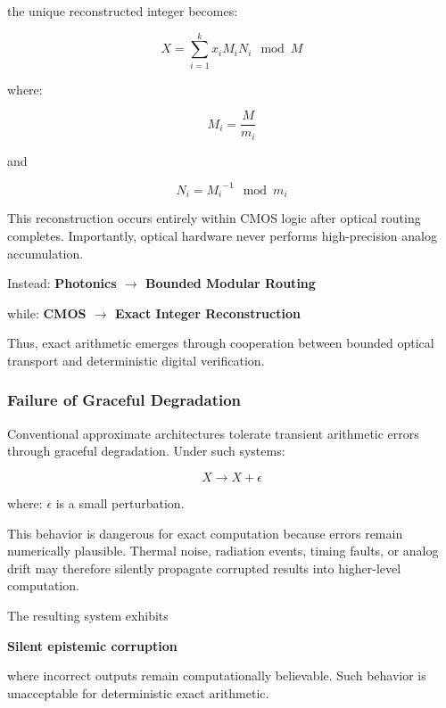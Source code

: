 \documentclass[journal]{IEEEtran}
\begin{document}
the unique reconstructed integer becomes:

\begin{equation}
X = \sum_{i=1}^k x_i M_i N_i \mod M
\end{equation}

where:

\begin{equation}
M_i = \frac{M}{m_i}
\end{equation}

and

\begin{equation}
N_i = {M_i}^{-1} \mod m_i
\end{equation}

This reconstruction occurs entirely within CMOS logic after optical routing completes. Importantly, optical hardware never performs high-precision analog accumulation.

Instead:
\textbf{Photonics $\rightarrow$ Bounded Modular Routing}

while:
\textbf{CMOS $\rightarrow$ Exact Integer Reconstruction}

Thus, exact arithmetic emerges through cooperation between bounded optical transport and deterministic digital verification.

\subsubsection{\textbf{Failure of Graceful Degradation}}

Conventional approximate architectures tolerate transient arithmetic errors through graceful degradation. Under such systems:

\begin{equation}
X \rightarrow X + \epsilon
\end{equation}

where: $\epsilon$ is a small perturbation.

This behavior is dangerous for exact computation because errors remain numerically plausible. Thermal noise, radiation events, timing faults, or analog drift may therefore silently propagate corrupted results into higher-level computation.

The resulting system exhibits 

\begin{center}
\textbf{Silent epistemic corruption}
\end{center}

where incorrect outputs remain computationally believable. Such behavior is unacceptable for deterministic exact arithmetic.
\end{document}
